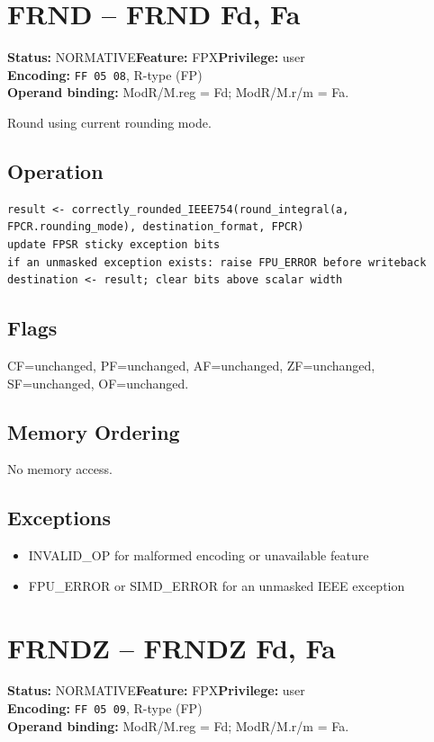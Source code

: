 \documentclass[10pt]{article}
\begin{document}
\section{FRND -- FRND Fd, Fa}
\textbf{Status:} NORMATIVE\quad \textbf{Feature:} FPX\quad \textbf{Privilege:} user\\
\textbf{Encoding:} \texttt{FF 05 08}, R-type (FP)\\
\textbf{Operand binding:} ModR/M.reg = Fd; ModR/M.r/m = Fa.

Round using current rounding mode.

\subsection*{Operation}
\begin{lstlisting}
result <- correctly_rounded_IEEE754(round_integral(a, FPCR.rounding_mode), destination_format, FPCR)
update FPSR sticky exception bits
if an unmasked exception exists: raise FPU_ERROR before writeback
destination <- result; clear bits above scalar width
\end{lstlisting}
\subsection*{Flags}
CF=unchanged, PF=unchanged, AF=unchanged, ZF=unchanged, SF=unchanged, OF=unchanged.
\subsection*{Memory Ordering}
No memory access.
\subsection*{Exceptions}
\begin{itemize}
\item INVALID\_OP for malformed encoding or unavailable feature
\item FPU\_ERROR or SIMD\_ERROR for an unmasked IEEE exception
\end{itemize}
\clearpage

\section{FRNDZ -- FRNDZ Fd, Fa}
\textbf{Status:} NORMATIVE\quad \textbf{Feature:} FPX\quad \textbf{Privilege:} user\\
\textbf{Encoding:} \texttt{FF 05 09}, R-type (FP)\\
\textbf{Operand binding:} ModR/M.reg = Fd; ModR/M.r/m = Fa.
\end{document}
